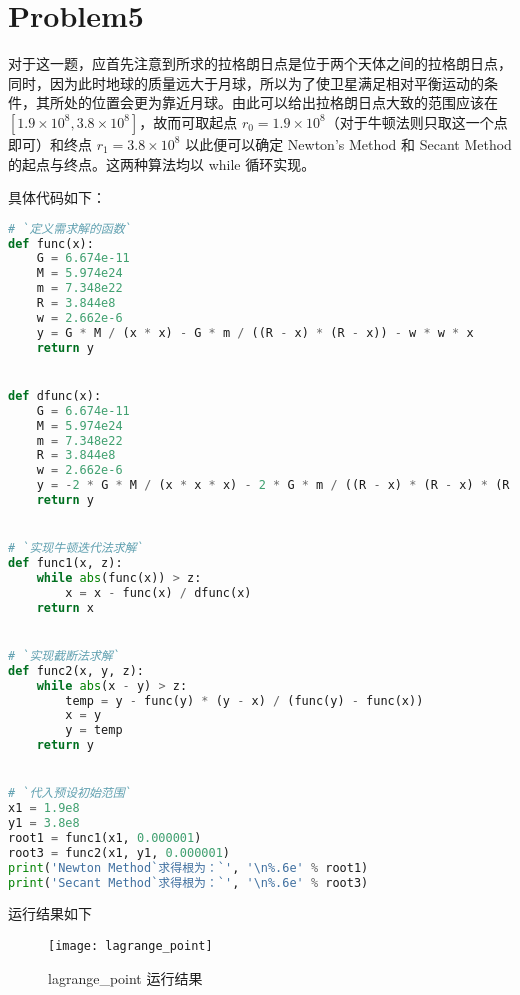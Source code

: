 \documentclass[UTF8]{ctexart}
\begin{document}
    \nextpage
    \section{Problem5}\label{sec:problem5}
    对于这一题，应首先注意到所求的拉格朗日点是位于两个天体之间的拉格朗日点，同时，因为此时地球的质量远大于月球，所以为了使卫星满足相对平衡运动的条件，其所处的位置会更为靠近月球。由此可以给出拉格朗日点大致的范围应该在 \([1.9 \times 10^8, 3.8 \times 10^8]\)，故而可取起点 \(r_0 = 1.9 \times 10^8\)（对于牛顿法则只取这一个点即可）和终点 \(r_1 = 3.8 \times 10^8\) 以此便可以确定 Newton’s Method 和 Secant Method 的起点与终点。这两种算法均以 while 循环实现。

    具体代码如下：
    \begin{lstlisting}[language=Python, breaklines = true,label={lst:lstlisting5}]
# `定义需求解的函数`
def func(x):
    G = 6.674e-11
    M = 5.974e24
    m = 7.348e22
    R = 3.844e8
    w = 2.662e-6
    y = G * M / (x * x) - G * m / ((R - x) * (R - x)) - w * w * x
    return y


def dfunc(x):
    G = 6.674e-11
    M = 5.974e24
    m = 7.348e22
    R = 3.844e8
    w = 2.662e-6
    y = -2 * G * M / (x * x * x) - 2 * G * m / ((R - x) * (R - x) * (R - x)) - w * w
    return y


# `实现牛顿迭代法求解`
def func1(x, z):
    while abs(func(x)) > z:
        x = x - func(x) / dfunc(x)
    return x


# `实现截断法求解`
def func2(x, y, z):
    while abs(x - y) > z:
        temp = y - func(y) * (y - x) / (func(y) - func(x))
        x = y
        y = temp
    return y


# `代入预设初始范围`
x1 = 1.9e8
y1 = 3.8e8
root1 = func1(x1, 0.000001)
root3 = func2(x1, y1, 0.000001)
print('Newton Method`求得根为：`', '\n%.6e' % root1)
print('Secant Method`求得根为：`', '\n%.6e' % root3)
    \end{lstlisting}
    运行结果如下
    \begin{figure}[h]
        \centering
        \texttt{[image: lagrange\_point]}
        \caption{lagrange\_point 运行结果}\label{fig:figure5}
    \end{figure}
\end{document}
